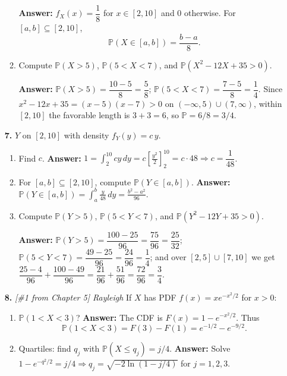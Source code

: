 \documentclass[11pt]{article}
\begin{document}
\begin{enumerate}
\begin{enumerate}[label=(\alph*)]
\textbf{Answer:} $f_X(x)=\dfrac{1}{8}$ for $x\in[2,10]$ and $0$ otherwise. For $[a,b]\subseteq[2,10]$,
\[
\mathbb{P}(X\in[a,b])=\dfrac{b-a}{8}.
\]

\item Compute $\mathbb{P}(X>5)$, $\mathbb{P}(5<X<7)$, and $\mathbb{P}(X^2-12X+35>0)$.

\textbf{Answer:} $\mathbb{P}(X>5)=\dfrac{10-5}{8}=\dfrac{5}{8}$; \quad
$\mathbb{P}(5<X<7)=\dfrac{7-5}{8}=\dfrac{1}{4}$.
Since $x^2-12x+35=(x-5)(x-7)>0$ on $(-\infty,5)\cup(7,\infty)$, within $[2,10]$ the favorable length is $3+3=6$, so $\mathbb{P}=6/8=3/4$.
\end{enumerate}

\item[\textbf{7.}] $Y$ on $[2,10]$ with density $f_Y(y)=c\,y$.

\begin{enumerate}[label=(\alph*)]
\item Find $c$.
\quad \textbf{Answer:} $1=\int_2^{10} c y\,dy = c\left[\tfrac{y^2}{2}\right]_2^{10}=c\cdot 48 \Rightarrow c=\dfrac{1}{48}$.

\item For $[a,b]\subseteq[2,10]$, compute $\mathbb{P}(Y\in[a,b])$.
\quad \textbf{Answer:} $\displaystyle \mathbb{P}(Y\in[a,b])=\int_a^b \frac{y}{48}\,dy=\frac{b^2-a^2}{96}$.

\item Compute $\mathbb{P}(Y>5)$, $\mathbb{P}(5<Y<7)$, and $\mathbb{P}(Y^2-12Y+35>0)$.

\textbf{Answer:} $\mathbb{P}(Y>5)=\dfrac{100-25}{96}=\dfrac{75}{96}=\dfrac{25}{32}$;\quad
$\mathbb{P}(5<Y<7)=\dfrac{49-25}{96}=\dfrac{24}{96}=\dfrac14$;\quad
and over $[2,5]\cup[7,10]$ we get $\dfrac{25-4}{96}+\dfrac{100-49}{96}=\dfrac{21}{96}+\dfrac{51}{96}=\dfrac{72}{96}=\dfrac{3}{4}$.
\end{enumerate}

\item[\textbf{8.}] \emph{[\#1 from Chapter 5] Rayleigh} If $X$ has PDF $f(x)=x e^{-x^2/2}$ for $x>0$:

\begin{enumerate}[label=(\alph*)]
\item $\mathbb{P}(1<X<3)$?
\quad \textbf{Answer:} The CDF is $F(x)=1-e^{-x^2/2}$. Thus
\[
\mathbb{P}(1<X<3)=F(3)-F(1)=e^{-1/2}-e^{-9/2}.
\]

\item Quartiles: find $q_j$ with $\mathbb{P}(X\le q_j)=j/4$.
\quad \textbf{Answer:} Solve $1-e^{-q^2/2}=j/4 \Rightarrow q_j=\sqrt{-2\ln(1-j/4)}$ for $j=1,2,3$.
\end{enumerate}


\end{enumerate}
\end{document}
